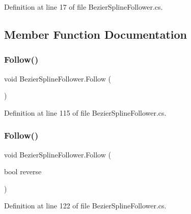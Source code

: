 Definition at line 17 of file Bezier\+Spline\+Follower.\+cs.



\subsection{Member Function Documentation}
\mbox{\label{class_bezier_spline_follower_a3619ed2ff2189fc411c3d9c67d4fa0ec}} 
\subsubsection{\texorpdfstring{Follow()}{Follow()}\hspace{0.1cm}{\footnotesize\ttfamily [1/2]}}
{\footnotesize\ttfamily void Bezier\+Spline\+Follower.\+Follow (\begin{DoxyParamCaption}{ }\end{DoxyParamCaption})}



Definition at line 115 of file Bezier\+Spline\+Follower.\+cs.

\mbox{\label{class_bezier_spline_follower_a54b7a38ffdce65e5e38c18774a558ef2}} 
\subsubsection{\texorpdfstring{Follow()}{Follow()}\hspace{0.1cm}{\footnotesize\ttfamily [2/2]}}
{\footnotesize\ttfamily void Bezier\+Spline\+Follower.\+Follow (\begin{DoxyParamCaption}\item[{bool}]{reverse }\end{DoxyParamCaption})}



Definition at line 122 of file Bezier\+Spline\+Follower.\+cs.

\mbox{\label{class_bezier_spline_follower_ad7f72b44b84a3572bdee23536aef8004}} 
